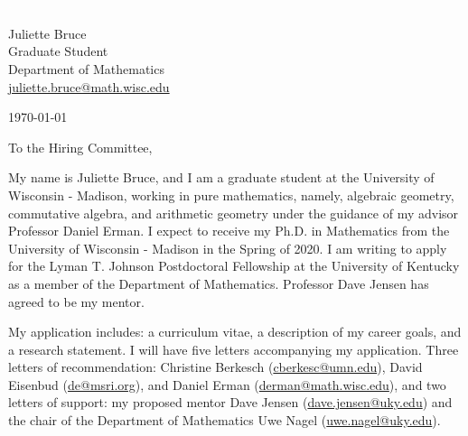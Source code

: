 \documentclass[11pt]{article}
\begin{document}
\section*{}

\noindent
\begin{minipage}{0.99\textwidth}
\begin{minipage}{0.69\textwidth}
\textcolor{white}{.}
\end{minipage}
\begin{minipage}{0.29\textwidth}
{
Juliette Bruce \\
Graduate Student \\
Department of Mathematics \\
\href{mailto:juliette.bruce@math.wisc.edu}{juliette.bruce@math.wisc.edu}
}

\vspace{12pt}
\today
\end{minipage}
\end{minipage}


\vspace{12pt}
\noindent
To the Hiring Committee,

My name is Juliette Bruce, and I am a graduate student at the University of Wisconsin - Madison, working in pure mathematics, namely, algebraic geometry, commutative algebra, and arithmetic geometry under the guidance of my advisor Professor Daniel Erman. I expect to receive my Ph.D. in Mathematics from the University of Wisconsin - Madison in the Spring of 2020. I am writing to apply for the Lyman T. Johnson Postdoctoral Fellowship at the University of Kentucky as a member of the Department of Mathematics. Professor Dave Jensen has agreed to be my mentor. 

My application includes:  a curriculum vitae, a description of my career goals, and a research statement. I will have five letters accompanying my application. Three letters of recommendation: Christine Berkesch (\href{mailto:cberkesc@umn.edu}{cberkesc@umn.edu}), David Eisenbud (\href{mailto:de@msri.org}{de@msri.org}), and Daniel Erman (\href{mailto:derman@math.wisc.edu}{derman@math.wisc.edu}), and two letters of support: my proposed mentor Dave Jensen (\href{dave.jensen@uky.edu}{dave.jensen@uky.edu}) and the chair of the Department of Mathematics Uwe Nagel (\href{uwe.nagel@uky.edu}{uwe.nagel@uky.edu}).
\end{document}

